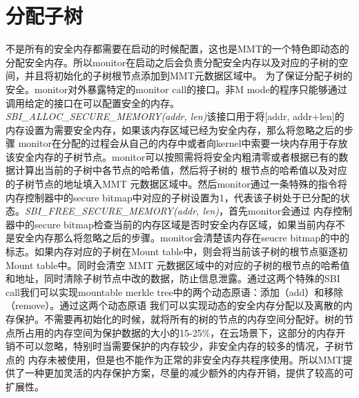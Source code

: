 \section{分配子树}
不是所有的安全内存都需要在启动的时候配置，这也是MMT的一个特色即动态的分配安全内存。所以monitor在启动之后会负责分配安全内存以及对应的子树的空间，并且将初始化的子树根节点添加到MMT元数据区域中。
为了保证分配子树的安全。monitor对外暴露特定的monitor call的接口。非M mode的程序只能够通过调用给定的接口在可以配置安全的内存。\emph{SBI\_ALLOC\_SECURE\_MEMORY(addr, len)}该接口用于将[addr, addr+len]的内存设置为需要安全内存，如果该内存区域已经为安全内存，那么将忽略之后的步骤
monitor在分配的过程会从自己的内存中或者向kernel中索要一块内存用于存放该安全内存的子树节点。monitor可以按照需将将安全内粗清零或者根据已有的数据计算出当前的子树中各节点的哈希值，然后将子树的
根节点的哈希值以及对应的子树节点的地址填入MMT 元数据区域中。然后monitor通过一条特殊的指令将内存控制器中的secure bitmap中对应的子树设置为1，代表该子树处于已分配的状态。\emph{SBI\_FREE\_SECURE\_MEMORY(addr, len)}，首先monitor会通过
内存控制器中的secure bitmap检查当前的内存区域是否时安全内存区域，如果当前内存不是安全内存那么将忽略之后的步骤。monitor会清楚该内存在seucre bitmap的中的标志。如果内存对应的子树在Mount table中，则会将当前该子树的根节点驱逐初Mount table中。同时会清空
MMT 元数据区域中的对应的子树的根节点的哈希值和地址，同时清除子树节点中改的数据，防止信息泄露。通过这两个特殊的SBI call我们可以实现mountable merkle tree中的两个动态原语：添加（add）和移除（remove）。通过这两个动态原语
我们可以实现动态的安全内存分配以及离散的内存保护。不需要再初始化的时候，就将所有的树的节点的内存空间分配好。树的节点所占用的内存空间为保护数据的大小的15-25\%，在云场景下，这部分的内存开销不可以忽略，特别时当需要保护的内存较少，非安全内存的较多的情况，子树节点的
内存未被使用，但是也不能作为正常的非安全内存共程序使用。所以MMT提供了一种更加灵活的内存保护方案，尽量的减少额外的内存开销，提供了较高的可扩展性。

